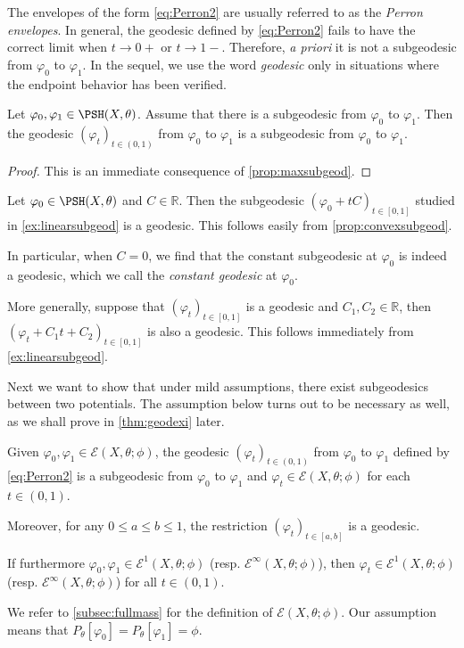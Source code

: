 The envelopes of the form \eqref{eq:Perron2} are usually referred to as the \emph{Perron envelopes}. In general, the geodesic defined by \eqref{eq:Perron2} fails to have the correct limit when $t\to 0+$ or $t\to 1-$. Therefore, \emph{a priori} it is not a subgeodesic from $\varphi_0$ to $\varphi_1$. In the sequel, we use the word \emph{geodesic} only in situations where the endpoint behavior has been verified.

\begin{lemma}\label{lma:geodsubgeod}
    Let $\varphi_0,\varphi_1\in \PSH(X,\theta)$. Assume that there is a subgeodesic from $\varphi_0$ to $\varphi_1$. Then the geodesic $(\varphi_t)_{t\in (0,1)}$ from $\varphi_0$ to $\varphi_1$ is a subgeodesic from $\varphi_0$ to $\varphi_1$.
\end{lemma}
\begin{proof}
    This is an immediate consequence of \cref{prop:maxsubgeod}.
\end{proof}



\begin{example}\label{ex:lineargeod}
    Let $\varphi_0\in \PSH(X,\theta)$ and $C\in \mathbb{R}$. Then the subgeodesic $(\varphi_0+tC)_{t\in [0,1]}$ studied in \cref{ex:linearsubgeod} is a geodesic. This follows easily from \cref{prop:convexsubgeod}.

    In particular, when $C=0$, we find that the constant subgeodesic at $\varphi_0$ is indeed a geodesic, which we call the \emph{constant geodesic} at $\varphi_0$.

    More generally, suppose that $(\varphi_t)_{t\in [0,1]}$ is a geodesic and $C_1,C_2\in \mathbb{R}$, then $(\varphi_t+C_1t+C_2)_{t\in [0,1]}$ is also a geodesic. This follows immediately from \cref{ex:linearsubgeod}.
\end{example}

Next we want to show that under mild assumptions, there exist subgeodesics between two potentials. The assumption below turns out to be necessary as well, as we shall prove in \cref{thm:geodexi} later.
\begin{proposition}\label{prop:perronenvissubgeod}
Given $\varphi_0, \varphi_1 \in \mathcal{E}(X,\theta;\phi)$, the geodesic $(\varphi_t)_{t\in (0,1)}$ from $\varphi_0$ to $\varphi_1$ defined by \eqref{eq:Perron2} is a subgeodesic from $\varphi_0$ to $\varphi_1$ and $\varphi_t\in \mathcal{E}(X,\theta;\phi)$ for each $t\in (0,1)$.

Moreover, for any $0\leq a\leq b\leq 1$, the restriction $(\varphi_t)_{t\in [a,b]}$ is a geodesic.

If furthermore $\varphi_0,\varphi_1\in \mathcal{E}^1(X,\theta;\phi)$ (resp. $\mathcal{E}^{\infty}(X,\theta;\phi)$), then $\varphi_t\in \mathcal{E}^1(X,\theta;\phi)$ (resp. $\mathcal{E}^{\infty}(X,\theta;\phi)$) for all $t\in (0,1)$.
\end{proposition}
We refer to \cref{subsec:fullmass} for the definition of $\mathcal{E}(X,\theta;\phi)$. Our assumption means that $P_{\theta}[\varphi_0]=P_{\theta}[\varphi_1]=\phi$.


